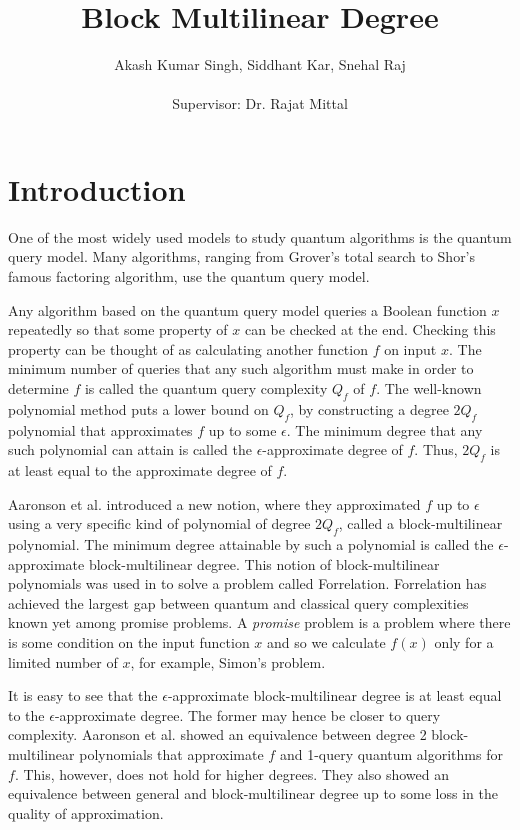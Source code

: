 \documentclass[12pt]{report}
\title{Block Multilinear Degree}
\author{Akash Kumar Singh, Siddhant Kar, Snehal Raj\\\\Supervisor: Dr. Rajat Mittal}
\date{}
\begin{document}
\maketitle
\tableofcontents

\chapter{Introduction}
One of the most widely used models to study quantum algorithms is the quantum query model. Many algorithms, ranging from Grover's total search to Shor's famous factoring algorithm, use the quantum query model.

Any algorithm based on the quantum query model queries a Boolean function $x$ repeatedly so that some property of $x$ can be checked at the end. Checking this property can be thought of as calculating another function $f$ on input $x$. The minimum number of queries that any such algorithm must make in order to determine $f$ is called the quantum query complexity $Q_f$ of $f$. The well-known polynomial method puts a lower bound on $Q_f$, by constructing a degree $2Q_f$ polynomial that approximates $f$ up to some $\epsilon$. The minimum degree that any such polynomial can attain is called the $\epsilon$-approximate degree of $f$. Thus, $2Q_f$ is at least equal to the approximate degree of $f$.

Aaronson et al. \cite{paper1} introduced a new notion, where they approximated $f$ up to $\epsilon$ using a very specific kind of polynomial of degree $2Q_f$, called a block-multilinear polynomial. The minimum degree attainable by such a polynomial is called the $\epsilon$-approximate block-multilinear degree. This notion of block-multilinear polynomials was used in \cite{paper1} to solve a problem called Forrelation. Forrelation has achieved the largest gap between quantum and classical query complexities known yet among promise problems. A \textit{promise} problem is a problem where there is some condition on the input function $x$ and so we calculate $f(x)$ only for a limited number of $x$, for example, Simon's problem.

It is easy to see that the $\epsilon$-approximate block-multilinear degree is at least equal to the $\epsilon$-approximate degree. The former may hence be closer to query complexity. Aaronson et al. \cite{paper2} showed an equivalence between degree 2 block-multilinear polynomials that approximate $f$ and 1-query quantum algorithms for $f$. This, however, does not hold for higher degrees. They also showed an equivalence between general and block-multilinear degree up to some loss in the quality of approximation.
\end{document}
